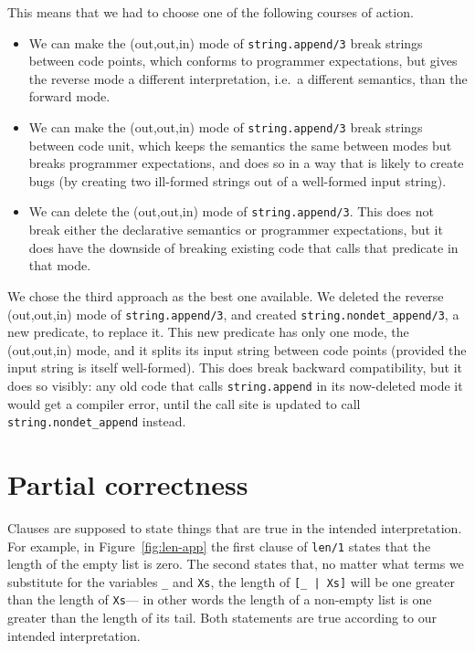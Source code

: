 This means that we had to choose one of the following courses of action.
\begin{itemize}
\item
We can make the (out,out,in) mode of \texttt{string.append/3}
break strings between code points,
which conforms to programmer expectations,
but gives the reverse mode a different interpretation,
i.e.\ a different semantics, than the forward mode.
\item
We can make the (out,out,in) mode of \texttt{string.append/3}
break strings between code unit,
which keeps the semantics the same between modes
but breaks programmer expectations,
and does so in a way that is likely to create bugs
(by creating two ill-formed strings out of a well-formed input string).
\item
We can delete the (out,out,in) mode of \texttt{string.append/3}.
This does not break either the declarative semantics
or programmer expectations,
but it does have the downside of breaking existing code
that calls that predicate in that mode.
\end{itemize}

We chose the third approach as the best one available.
We deleted the reverse (out,out,in) mode of \texttt{string.append/3},
and created \texttt{string.nondet\_append/3}, a new predicate,
to replace it.
This new predicate has only one mode, the (out,out,in) mode,
and it splits its input string between code points
(provided the input string is itself well-formed).
This does break backward compatibility, but it does so visibly:
any old code that calls \texttt{string.append}
in its now-deleted mode it would get a compiler error,
until the call site is updated to call \texttt{string.nondet\_append} instead.


\section{Partial correctness}
\label{sec:partial-correctness}

Clauses are supposed to state things that are
true in the intended interpretation.
For example,
in Figure~\ref{fig:len-app}
the first clause of \texttt{len/1} states that
the length of the empty list is zero.
The second states that,
no matter what terms we substitute
for the variables \texttt{\_} and \texttt{Xs},
the length of \texttt{[\_~|~Xs]} will be one greater than
the length of \texttt{Xs}---%
in other words the length of a non-empty list
is one greater than the length of its tail.
Both statements are true
according to our intended interpretation.

